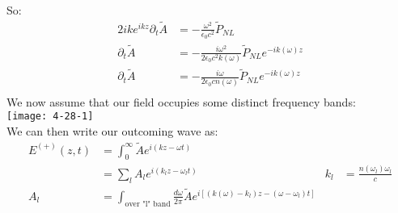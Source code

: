 So:
\begin{align*}
	2ike^{ikz} \partial_t \tilde{A} &= -\frac{\omega^2}{\epsilon_0 c^2}\tilde{P}_{NL} \\
	\partial_t \tilde{A} &= -\frac{i\omega^2}{2\epsilon_0 c^2k(\omega)}\tilde{P}_{NL} e^{-ik(\omega)z} \\
	\partial_t \tilde{A} &= -\frac{i\omega}{2\epsilon_0 cn(\omega)}\tilde{P}_{NL} e^{-ik(\omega)z} \\
\end{align*}
We now assume that our field occupies some distinct frequency bands:\\
\texttt{[image: 4-28-1]}\\
We can then write our outcoming wave as:
\begin{align*}
	E^{(+)}(z,t) &= \int_0^\infty \tilde{A} e^{i(kz-\omega t)} \\
	&= \sum_l A_l e^{i(k_l z - \omega_l t)} & k_l &= \frac{n(\omega_l)\omega_l}{c} \\
	A_l &= \int_{\text{over "l" band}} \frac{d\omega}{2\pi} \tilde{A} e^{i[(k(\omega)- k_l)z - (\omega-\omega_l)t]}
\end{align*}
